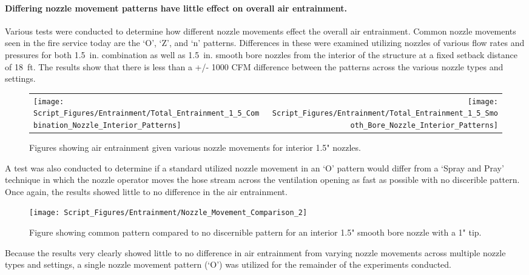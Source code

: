 \documentclass{article}
\begin{document}
\clearpage

\paragraph{Differing nozzle movement patterns have little effect on overall air entrainment.} \mbox{}

Various tests were conducted to determine how different nozzle movements effect the overall air entrainment. Common nozzle movements seen in the fire service today are the `O', `Z', and `n' patterns. Differences in these were examined utilizing nozzles of various flow rates and pressures for both 1.5~in. combination as well as 1.5~in. smooth bore nozzles from the interior of the structure at a fixed setback distance of 18~ft. The results show that there is less than a +/- 1000 CFM difference between the patterns across the various nozzle types and settings.

\begin{figure}[!ht]
\begin{tabular*}{\textwidth}{lr}
\texttt{[image: Script\_Figures/Entrainment/Total\_Entrainment\_1\_5\_Combination\_Nozzle\_Interior\_Patterns]} &
\texttt{[image: Script\_Figures/Entrainment/Total\_Entrainment\_1\_5\_Smooth\_Bore\_Nozzle\_Interior\_Patterns]} \\
\end{tabular*}
\caption{Figures showing air entrainment given various nozzle movements for interior 1.5" nozzles.}
\label{fig:1_5_Interior_Nozzle_Movement_Comparison}
\end{figure}

\clearpage

A test was also conducted to determine if a standard utilized nozzle movement in an `O' pattern would differ from a `Spray and Pray' technique in which the nozzle operator moves the hose stream across the ventilation opening as fast as possible with no discerible pattern. Once again, the results showed little to no difference in the air entrainment.

\begin{figure}[!ht]
	\centering
	\texttt{[image: Script\_Figures/Entrainment/Nozzle\_Movement\_Comparison\_2]}
	\caption{Figure showing common pattern compared to no discernible pattern for an interior 1.5" smooth bore nozzle with a 1" tip.}
	\label{fig:1_5_Interior_Nozzle_Movement_PatterntoNoPattern_Comparison}
\end{figure}

Because the results very clearly showed little to no difference in air entrainment from varying nozzle movements across multiple nozzle types and settings, a single nozzle movement pattern (`O') was utilized for the remainder of the experiments conducted.
\end{document}
